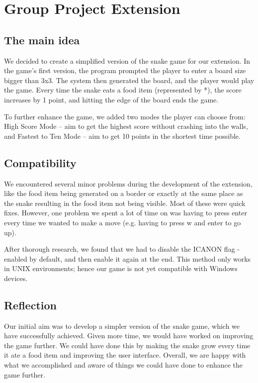 \documentclass[11pt]{article}
\begin{document}
\section{Group Project Extension}
\subsection{The main idea}
\-\hspace{0.6cm}We decided to create a simplified version of the snake game for our extension. In the game's first version, the program prompted the player to enter a board size bigger than 3x3. The system then generated the board, and the player would play the game. Every time the snake eats a food item (represented by *), the score increases by 1 point, and hitting the edge of the board ends the game.

To further enhance the game, we added two modes the player can choose from: High Score Mode – aim to get the highest score without crashing into the walls, and Fastest to Ten Mode – aim to get 10 points in the shortest time possible. 

\subsection{Compatibility}
\-\hspace{0.6cm}We encountered several minor problems during the development of the extension, like the food item being generated on a border or exactly at the same place as the snake resulting in the food item not being visible. Most of these were quick fixes. However, one problem we spent a lot of time on was having to press enter every time we wanted to make a move (e.g. having to press w and enter to go up). 

After thorough research, we found that we had to disable the ICANON flag - enabled by default, and then enable it again at the end. This method only works in UNIX environments; hence our game is not yet compatible with Windows devices.

\subsection{Reflection}
\-\hspace{0.6cm}Our initial aim was to develop a simpler version of the snake game, which we have successfully achieved. Given more time, we would have worked on improving the game further. We could have done this by making the snake grow every time it ate a food item and improving the user interface. Overall, we are happy with what we accomplished and aware of things we could have done to enhance the game further. 
\end{document}
